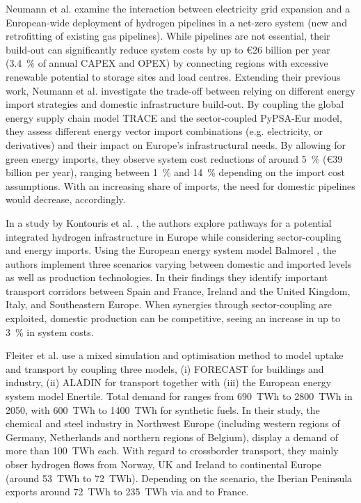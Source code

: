 \documentclass[preprint,12pt,sort&compress]{elsarticle}
\begin{document}
Neumann et al. \cite{neumannPotentialRoleHydrogen2023} examine the interaction between electricity grid expansion and a European-wide deployment of hydrogen pipelines in a net-zero system (new and retrofitting of existing gas pipelines). While  pipelines are not essential, their build-out can significantly reduce system costs by up to \euro{26} billion per year (\SI{3.4}{\percent} of annual CAPEX and OPEX) by connecting regions with excessive renewable potential to storage sites and load centres. 
Extending their previous work, Neumann et al. \cite{neumannGreenEnergySteel2025} investigate the trade-off between relying on different energy import strategies and domestic infrastructure build-out. By coupling the global energy supply chain model TRACE \cite{hamppImportOptionsChemical2023} and the sector-coupled PyPSA-Eur model, they assess different energy vector import combinations (e.g. electricity,  or  derivatives) and their impact on Europe's infrastructural needs. 
By allowing for green energy imports, they observe system cost reductions of around \SI{5}{\percent} (\euro{39} billion per year), ranging between \SI{1}{\percent} and \SI{14}{\percent} depending on the import cost assumptions. With an increasing share of  imports, the need for domestic  pipelines would decrease, accordingly.

In a study by Kontouris et al. \cite{kountourisUnifiedEuropeanHydrogen2024}, the authors explore pathways for a potential integrated hydrogen infrastructure in Europe while considering sector-coupling and energy imports. Using the European energy system model Balmorel \cite{wieseBalmorelOpenSource2018}, the authors implement three scenarios varying between domestic and imported  levels as well as  production technologies. In their findings they identify important  transport corridors between Spain and France, Ireland and the United Kingdom, Italy, and Southeastern Europe. When synergies through sector-coupling are exploited, domestic  production can be competitive, seeing an increase in up to \SI{3}{\percent} in system costs.

Fleiter et al. \cite{fleiterHydrogenInfrastructureFuture2025} use a mixed simulation and optimisation method to model  uptake and transport by coupling three models, (i) FORECAST for buildings and industry, (ii) ALADIN for transport together with (iii) the European energy system model Enertile. Total demand for  ranges from \SI{690}{TWh} to \SI{2800}{TWh} in 2050, with \SI{600}{TWh} to \SI{1400}{TWh} for synthetic fuels. In their study, the  chemical and steel industry in Northwest Europe (including western regions of Germany, Netherlands and northern regions of Belgium), display a demand of more than \SI{100}{TWh} each. With regard to crossborder transport, they mainly obser hydrogen flows from Norway, UK and Ireland to continental Europe (around \SI{53}{TWh} to \SI{72}{TWh}). Depending on the scenario, the Iberian Peninsula exports around \SI{72}{TWh} to \SI{235}{TWh} via and to France.
\end{document}
